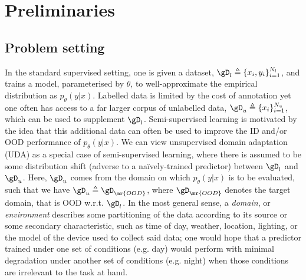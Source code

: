 \section{Preliminaries}\label{sec:prelims}
\subsection{Problem setting}
In the standard supervised setting, one is given a dataset, \( \gD_l \triangleq \{x_i,
y_i\}_{i=1}^{N_l} \), and trains a model, parameterised by \(\theta\), to well-approximate the
empirical distribution as \( p_\theta(y | x) \).
%
Labelled data is limited by the cost of annotation yet one often has access to a far larger corpus
of unlabelled data, \( \gD_u \triangleq \{x_i\}_{i=1}^{N_u} \), which can be used to supplement
\(\gD_l\). 
%
Semi-supervised learning is motivated by the idea that this additional data can often be used to
improve the ID and/or OOD performance of \(p_\theta(y | x)\).
%
We can view unsupervised domain adaptation (UDA) as a special case of semi-supervised learning,
where there is assumed to be some distribution shift (adverse to a na\"ively-trained predictor)
between \( \gD_l \) and \( \gD_u \).
%
Here, \( \gD_u \) comes from the domain on which \(p_\theta(y | x)\) is to be evaluated, such that
we have \( \gD_u \triangleq \gD_\mr{OOD} \), where \( \gD_\mr{OOD} \) denotes the target domain,
that is OOD w.r.t. \( \gD_l \).
%
In the most general sense, a \emph{domain}, or \emph{environment} \citep{arjovsky2019invariant,
creager2021environment} describes some partitioning of the data according to its source or some
secondary characteristic, such as time of day, weather, location, lighting, or the model of the
device used to collect said data; one would hope that a predictor trained under one set of
conditions (e.g. day) would perform with minimal degradation under another set of conditions (e.g.
night) when those conditions are irrelevant to the task at hand.
%

